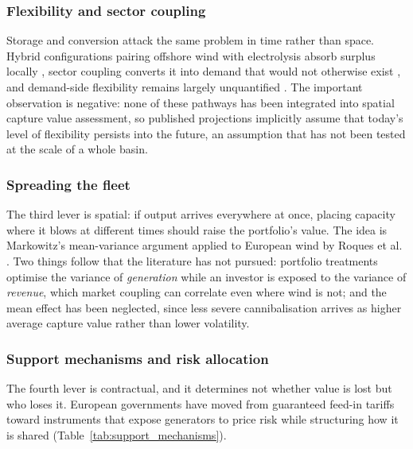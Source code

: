 \subsubsection{Flexibility and sector coupling}

Storage and conversion attack the same problem in time rather than space.
Hybrid configurations pairing offshore wind with electrolysis absorb surplus
locally \cite{OffshoreHybrids2024}, sector coupling converts it into demand that
would not otherwise exist \cite{Brown2021}, and demand-side flexibility remains
largely unquantified \cite{Hirth2015}. The important observation is negative:
none of these pathways has been integrated into spatial capture value
assessment, so published projections implicitly assume that today's level of
flexibility persists into the future, an assumption that has not been tested at
the scale of a whole basin.

\subsubsection{Spreading the fleet}

The third lever is spatial: if output arrives everywhere at once, placing
capacity where it blows at different times should raise the portfolio's value.
The idea is Markowitz's mean-variance argument \cite{Markowitz1952} applied to
European wind by Roques et al. \cite{Roques2010}. Two things follow that the
literature has not pursued: portfolio treatments optimise the variance of
\textit{generation} while an investor is exposed to the variance of
\textit{revenue}, which market coupling can correlate even where wind is not;
and the mean effect has been neglected, since less severe cannibalisation
arrives as higher average capture value rather than lower volatility.

\subsubsection{Support mechanisms and risk allocation}

The fourth lever is contractual, and it determines not whether value is lost but
who loses it. European governments have moved from guaranteed feed-in tariffs
toward instruments that expose generators to price risk while structuring how it
is shared (Table~\ref{tab:support_mechanisms}).

